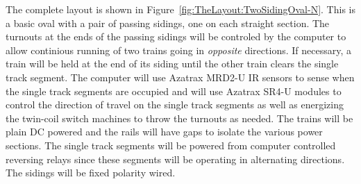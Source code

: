 The complete layout is shown in
Figure~\ref{fig:TheLayout:TwoSidingOval-N}. This is a basic oval with a
pair of passing sidings, one on each straight section. The turnouts at
the ends of the passing sidings will be controled by the computer to
allow continious running of two trains going in \textit{opposite}
directions.  If necessary, a train will be held at the end of its
siding until the other train clears the single track segment. The
computer will use Azatrax MRD2-U IR sensors to sense when the single
track segments are occupied and will use Azatrax SR4-U modules to
control the  direction of travel on the single track segments as well
as energizing the twin-coil switch machines to throw the turnouts as
needed. The trains will be plain DC powered and the rails will have gaps
to isolate the various power sections.  The single track segments will
be powered from computer controlled reversing relays since these segments
will be operating in alternating directions.  The sidings will be fixed
polarity wired.

